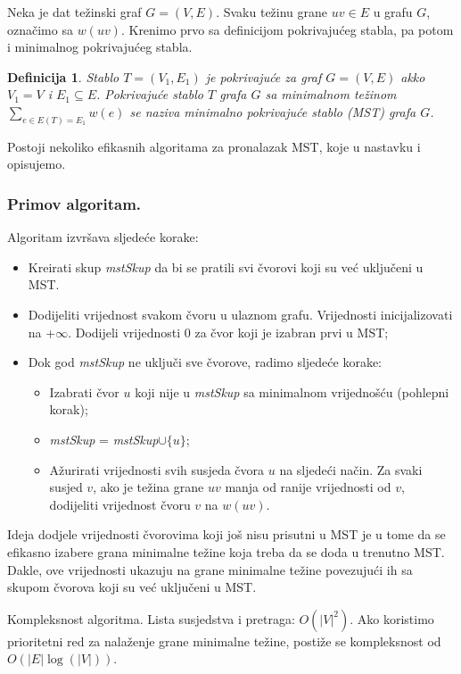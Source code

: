 \documentclass[a4paper, utf8, 11pt, colorlinks]{article}
\newtheorem{definition}{Definicija}
\begin{document}
Neka je dat težinski graf $G=(V,E)$. Svaku težinu grane $uv \in E $ u grafu $G$, označimo sa $w(uv)$. 
Krenimo prvo sa definicijom pokrivajućeg stabla, pa potom i minimalnog pokrivajućeg stabla. 
\begin{definition}
  Stablo $T =(V_1, E_1)$ je pokrivajuće za graf $G=(V,E)$ akko
  $V_1 = V$ i $E_1 \subseteq E$. Pokrivajuće stablo $T$ grafa $G$ sa minimalnom težinom 
  $\sum_{e \in E(T)=E_1} w(e)$ se naziva minimalno pokrivajuće stablo (MST) grafa $G$. 
\end{definition}
Postoji nekoliko efikasnih algoritama za pronalazak MST, koje u nastavku i opisujemo. 


\subsubsection{Primov algoritam.}

Algoritam izvršava sljedeće korake:

\begin{itemize}
	\item Kreirati skup \emph{mstSkup} da bi se pratili svi čvorovi koji su već uključeni u MST.
	\item Dodijeliti vrijednost svakom čvoru u ulaznom grafu. Vrijednosti inicijalizovati na +$\infty$. 
	      Dodijeli vrijednosti 0 za čvor koji je izabran prvi u MST;
	\item Dok god \emph{mstSkup} ne uključi sve čvorove, radimo sljedeće korake:
	\begin{itemize}
		\item Izabrati čvor $u$ koji nije u \emph{mstSkup} sa minimalnom vrijednošću (pohlepni korak);
		\item \emph{mstSkup} = \emph{mstSkup}$\cup \{u\}$;
		\item Ažurirati vrijednosti svih susjeda čvora $u$ na sljedeći način. 
		      Za svaki susjed $v$, ako je težina grane $uv$ manja od
		      ranije vrijednosti od $v$, dodijeliti vrijednost čvoru $v$ na $w(uv)$. 
	\end{itemize}
\end{itemize}

Ideja dodjele vrijednosti čvorovima koji još nisu prisutni u MST je u tome da se efikasno izabere grana minimalne težine koja treba da se doda u trenutno MST. Dakle, ove vrijednosti ukazuju na grane minimalne težine povezujući ih sa skupom čvorova koji su već uključeni u MST.

Kompleksnost algoritma. Lista susjedstva i pretraga: $O(|V|^2)$. Ako  koristimo prioritetni red za nalaženje grane minimalne težine, postiže se kompleksnost od $O( |E| \log(|V|))$. 
\end{document}
